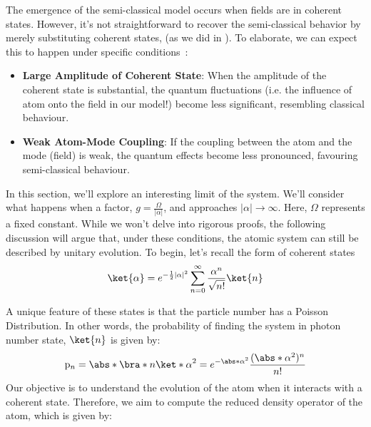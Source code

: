 The emergence of the semi-classical model occurs when fields are in
coherent states. However, it's not straightforward to recover the 
semi-classical behavior by merely substituting coherent states, (as we did in ). 
To elaborate, we can expect this to happen under specific conditions~\cite{semiclassical_limit_JC_PRL}:
\begin{itemize}
    \item \textbf{Large Amplitude of Coherent State}: When the amplitude of the coherent state is substantial, 
    the quantum fluctuations (i.e. the influence of atom onto the field in our model!) become less significant, 
    resembling classical behaviour.
    \item \textbf{Weak Atom-Mode Coupling}: If the coupling between the atom and the mode (field) is weak, 
    the quantum effects become less pronounced, favouring semi-classical behaviour.
\end{itemize}
In this section, we'll explore an interesting limit of the system. We'll consider what happens when a factor, $g = \frac{\Omega}{|\alpha|}$, and approaches $|\alpha| \rightarrow \infty$. Here, $\Omega$ represents a fixed constant. While we won't delve into rigorous proofs, the following discussion will argue that, under these conditions, the atomic system can still be described by unitary evolution. To begin, let's recall the form of coherent states
\begin{equation}
    \ket{\alpha} = e^{-\frac{1}{2}|\alpha|^2} \sum_{n=0}^{\infty} \frac{\alpha^n}{\sqrt{n!}} \ket{n}
\end{equation}
    
A unique feature of these states is that the particle number has a Poisson Distribution. In other words, the probability of finding the system in photon number state, \(\ket{n}\) is given by:
\begin{equation}
    \mathrm{p}_n = \abs*{\bra*{n}\ket*{\alpha}}^2 
    = e^{-\abs*{\alpha}^2}\frac{(\abs*{\alpha}^2)^n}{n!}
\end{equation}
Our objective is to understand the evolution of the atom when it interacts with a coherent state. 
Therefore, we aim to compute the reduced density operator of the atom, which is given by:

